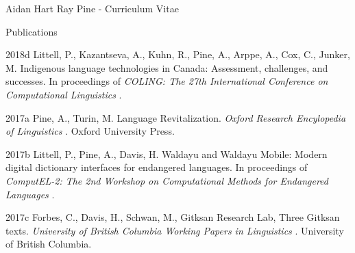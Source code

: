 \documentclass[12pt]{letter}
\begin{document}
\begin{cv}{ Aidan Hart Ray Pine  \space - \space   Curriculum Vitae}
\begin{cvlist}{Publications}
                                                                                \item[2018d] Littell, P., Kazantseva, A., Kuhn, R., Pine, A., Arppe, A., Cox, C., Junker, M.  Indigenous language technologies in Canada: Assessment, challenges, and successes. In proceedings of \textit{ COLING: The 27th International Conference on Computational Linguistics }.  
                                                                                                            \item[2017a]  Pine,  A.,  Turin,  M.  Language Revitalization. \textit{ Oxford Research Encylopedia of Linguistics }.  Oxford University Press.  
                                                                                \item[2017b] Littell, P., Pine, A., Davis, H.  Waldayu and Waldayu Mobile: Modern digital dictionary interfaces for endangered languages. In proceedings of \textit{ ComputEL-2: The 2nd Workshop on Computational Methods for Endangered Languages }.  
                                                                                \item[2017c]  Forbes,  C.,  Davis,  H.,  Schwan,  M.,  Gitksan Research Lab,   Three Gitksan texts. \textit{ University of British Columbia Working Papers in Linguistics }.  University of British Columbia.  
                                                        \end{cvlist}


\end{cv}
\end{document}
